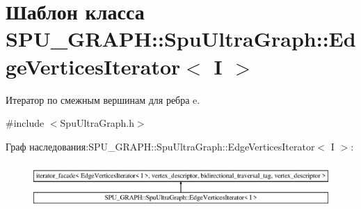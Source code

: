 \hypertarget{class_s_p_u___g_r_a_p_h_1_1_spu_ultra_graph_1_1_edge_vertices_iterator}{}\section{Шаблон класса S\+P\+U\+\_\+\+G\+R\+A\+PH\+:\+:Spu\+Ultra\+Graph\+:\+:Edge\+Vertices\+Iterator$<$ I $>$}
\label{class_s_p_u___g_r_a_p_h_1_1_spu_ultra_graph_1_1_edge_vertices_iterator}


Итератор по смежным вершинам для ребра e.  




{\ttfamily \#include $<$Spu\+Ultra\+Graph.\+h$>$}

Граф наследования\+:S\+P\+U\+\_\+\+G\+R\+A\+PH\+:\+:Spu\+Ultra\+Graph\+:\+:Edge\+Vertices\+Iterator$<$ I $>$\+:\begin{figure}[H]
\begin{center}
\leavevmode
\includegraphics[height=1.728395cm]{class_s_p_u___g_r_a_p_h_1_1_spu_ultra_graph_1_1_edge_vertices_iterator}
\end{center}
\end{figure}
